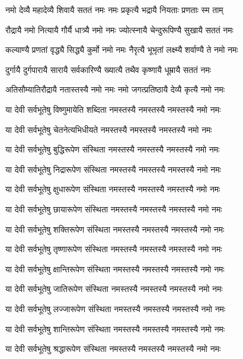 

\twolineshloka
{नमो देव्यै महादेव्यै शिवायै सततं नमः}
{नमः प्रकृत्यै भद्रायै नियताः प्रणताः स्म ताम्}%

\twolineshloka
{रौद्रायै नमो नित्यायै गौर्यै धात्र्यै नमो नमः}
{ज्योत्स्नायै चेन्दुरूपिण्यै सुखायै सततं नमः}%

\twolineshloka
{कल्याण्यै प्रणतां वृद्ध्यै सिद्ध्यै कुर्मो नमो नमः}
{नैरृत्यै भूभृतां लक्ष्म्यै शर्वाण्यै ते नमो नमः}%

\twolineshloka
{दुर्गायै दुर्गपारायै सारायै सर्वकारिण्यै}
{ख्यात्यै तथैव कृष्णायै धूम्रायै सततं नमः}%

\twolineshloka
{अतिसौम्यातिरौद्रायै नतास्तस्यै नमो नमः}
{नमो जगत्प्रतिष्ठायै देव्यै कृत्यै नमो नमः}%

\twolineshloka
{या देवी सर्वभूतेषु विष्णुमायेति शब्दिता}
{नमस्तस्यै नमस्तस्यै नमस्तस्यै नमो नमः}%

\twolineshloka
{या देवी सर्वभूतेषु चेतनेत्यभिधीयते}
{नमस्तस्यै नमस्तस्यै नमस्तस्यै नमो नमः}%

\twolineshloka
{या देवी सर्वभूतेषु बुद्धिरूपेण संस्थिता}
{नमस्तस्यै नमस्तस्यै नमस्तस्यै नमो नमः}%

\twolineshloka
{या देवी सर्वभूतेषु निद्रारूपेण संस्थिता}
{नमस्तस्यै नमस्तस्यै नमस्तस्यै नमो नमः}%

\twolineshloka
{या देवी सर्वभूतेषु क्षुधारूपेण संस्थिता}
{नमस्तस्यै नमस्तस्यै नमस्तस्यै नमो नमः}%

\twolineshloka
{या देवी सर्वभूतेषु छायारूपेण संस्थिता}
{नमस्तस्यै नमस्तस्यै नमस्तस्यै नमो नमः}%

\twolineshloka
{या देवी सर्वभूतेषु शक्तिरूपेण संस्थिता}
{नमस्तस्यै नमस्तस्यै नमस्तस्यै नमो नमः}%

\twolineshloka
{या देवी सर्वभूतेषु तृष्णारूपेण संस्थिता}
{नमस्तस्यै नमस्तस्यै नमस्तस्यै नमो नमः}%

\twolineshloka
{या देवी सर्वभूतेषु क्षान्तिरूपेण संस्थिता}
{नमस्तस्यै नमस्तस्यै नमस्तस्यै नमो नमः}%

\twolineshloka
{या देवी सर्वभूतेषु जातिरूपेण संस्थिता}
{नमस्तस्यै नमस्तस्यै नमस्तस्यै नमो नमः}%

\twolineshloka
{या देवी सर्वभूतेषु लज्जारूपेण संस्थिता}
{नमस्तस्यै नमस्तस्यै नमस्तस्यै नमो नमः}%

\twolineshloka
{या देवी सर्वभूतेषु शान्तिरूपेण संस्थिता}
{नमस्तस्यै नमस्तस्यै नमस्तस्यै नमो नमः}%

\twolineshloka
{या देवी सर्वभूतेषु श्रद्धारूपेण संस्थिता}
{नमस्तस्यै नमस्तस्यै नमस्तस्यै नमो नमः}%

